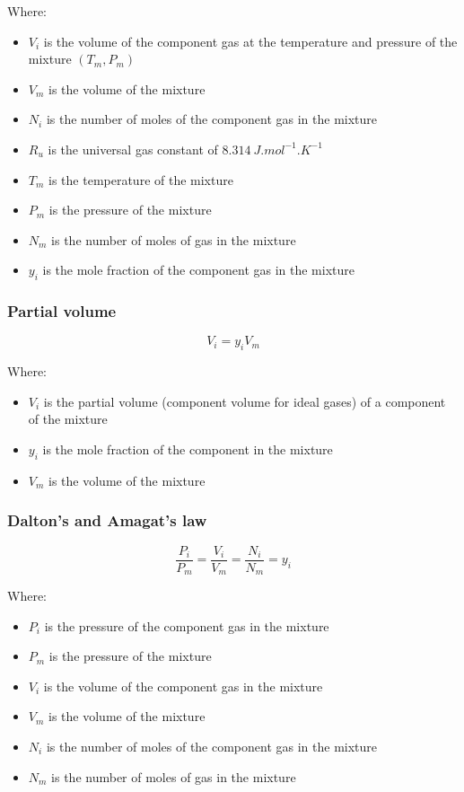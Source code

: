 \documentclass[11pt]{article}
\begin{document}
Where:
\begin{itemize}
\item \(V_i\) is the volume of the component gas at the temperature and pressure of the mixture \((T_m, P_m)\)
\item \(V_m\) is the volume of the mixture
\item \(N_i\) is the number of moles of the component gas in the mixture
\item \(R_u\) is the universal gas constant of \(\qty{8.314}{J.mol^{-1}.K^{-1}}\)
\item \(T_m\) is the temperature of the mixture
\item \(P_m\) is the pressure of the mixture
\item \(N_m\) is the number of moles of gas in the mixture
\item \(y_i\) is the mole fraction of the component gas in the mixture
\end{itemize}

\subsubsection{Partial volume}
\label{sec:org2c3ad34}
\[V_i = y_i V_m\]

Where:
\begin{itemize}
\item \(V_i\) is the partial volume (component volume for ideal gases) of a component of the mixture
\item \(y_i\) is the mole fraction of the component in the mixture
\item \(V_m\) is the volume of the mixture
\end{itemize}

 \newpage

\subsubsection{Dalton's and Amagat's law}
\label{sec:org7f61ae2}
\[\frac{P_i}{P_m} = \frac{V_i}{V_m} = \frac{N_i}{N_m} = y_i\]

Where:
\begin{itemize}
\item \(P_i\) is the pressure of the component gas in the mixture
\item \(P_m\) is the pressure of the mixture
\item \(V_i\) is the volume of the component gas in the mixture
\item \(V_m\) is the volume of the mixture
\item \(N_i\) is the number of moles of the component gas in the mixture
\item \(N_m\) is the number of moles of gas in the mixture
\end{itemize}
\end{document}
